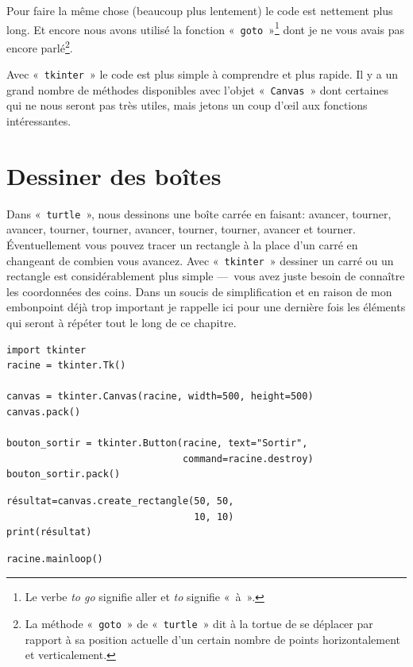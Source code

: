 Pour faire la même chose (beaucoup plus lentement) le code est nettement plus long. Et encore nous avons utilisé la fonction «~\texttt{goto}~»\footnote{Le verbe \emph{to go} signifie aller et \emph{to} signifie «~à~».} dont je ne vous avais pas encore parlé\footnote{La méthode «~\texttt{goto}~» de «~\texttt{turtle}~» dit à la tortue de se déplacer par rapport à sa position actuelle d'un certain nombre de points horizontalement et verticalement.}. 

Avec «~\texttt{tkinter}~» le code est plus simple à comprendre et plus rapide. Il y a un grand nombre de méthodes disponibles avec l'objet «~\texttt{Canvas}~» dont certaines qui ne nous seront pas très utiles, mais jetons un coup d'œil aux fonctions intéressantes.

\section{Dessiner des boîtes}

Dans «~\texttt{turtle}~», nous dessinons une boîte carrée en faisant: avancer, tourner, avancer, tourner, tourner, avancer, tourner, tourner, avancer et tourner. Éventuellement vous pouvez tracer un rectangle à la place d'un carré en changeant de combien vous avancez. Avec «~\texttt{tkinter}~» dessiner un carré ou un rectangle est considérablement plus simple ---~vous avez juste besoin de connaître les coordonnées des coins.
Dans un soucis de simplification et en raison de mon embonpoint déjà trop important je rappelle ici pour une dernière fois les éléments qui seront à répéter tout le long de ce chapitre.

\begin{Verbatim}[frame=single,rulecolor=\color{mbleu}, label=à taper (ne sera plus indiqué par la suite)]
import tkinter
racine = tkinter.Tk()

canvas = tkinter.Canvas(racine, width=500, height=500)
canvas.pack()

bouton_sortir = tkinter.Button(racine, text="Sortir",
                               command=racine.destroy)
bouton_sortir.pack()
\end{Verbatim}

\begin{Verbatim}[frame=single,rulecolor=\color{mbleu}, label=à taper]
résultat=canvas.create_rectangle(50, 50, 
                                 10, 10)
print(résultat)
\end{Verbatim}

\begin{Verbatim}[frame=single,rulecolor=\color{mbleu}, label=à taper (ne sera plus indiqué par la suite)]
racine.mainloop()
\end{Verbatim}

